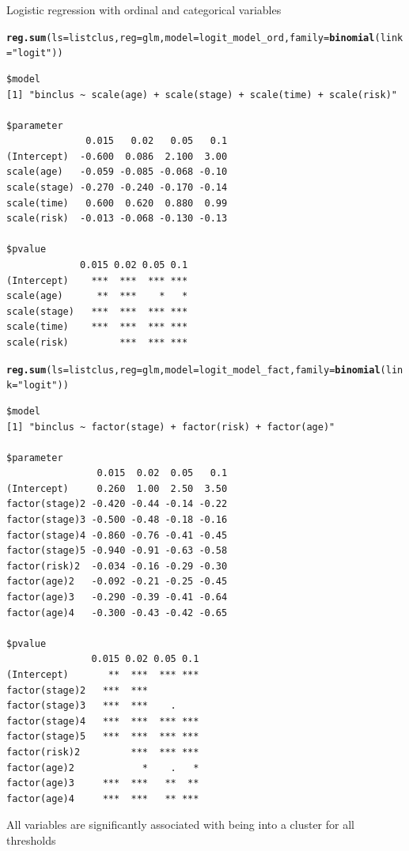\documentclass[]{revtex4}\usepackage[]{graphicx}\usepackage[]{color}
\makeatletter
\newcommand{\hlstr}[1]{\textcolor[rgb]{0.192,0.494,0.8}{#1}}%
\newcommand{\hlstd}[1]{\textcolor[rgb]{0.345,0.345,0.345}{#1}}%
\newcommand{\hlkwc}[1]{\textcolor[rgb]{0.333,0.667,0.333}{#1}}%
\newcommand{\hlkwd}[1]{\textcolor[rgb]{0.737,0.353,0.396}{\textbf{#1}}}%
\newenvironment{kframe}{%
 \def\at@end@of@kframe{}%
 \ifinner\ifhmode%
  \def\at@end@of@kframe{\end{minipage}}%
  \begin{minipage}{\columnwidth}%
 \fi\fi%
 \def\FrameCommand##1{\hskip\@totalleftmargin \hskip-\fboxsep
 \colorbox{shadecolor}{##1}\hskip-\fboxsep
     \hskip-\linewidth \hskip-\@totalleftmargin \hskip\columnwidth}%
 \MakeFramed {\advance\hsize-\width
   \@totalleftmargin\z@ \linewidth\hsize
   \@setminipage}}%
 {\par\unskip\endMakeFramed%
 \at@end@of@kframe}
\newenvironment{knitrout}{}{} %
\makeatother
\begin{document}
Logistic regression with ordinal and categorical variables
\begin{knitrout}
\color{fgcolor}\begin{kframe}
\begin{alltt}
\hlkwd{reg.sum}\hlstd{(}\hlkwc{ls} \hlstd{= listclus,} \hlkwc{reg} \hlstd{= glm,} \hlkwc{model} \hlstd{= logit_model_ord,} \hlkwc{family} \hlstd{=} \hlkwd{binomial}\hlstd{(}\hlkwc{link} \hlstd{=} \hlstr{"logit"}\hlstd{))}
\end{alltt}
\begin{verbatim}
$model
[1] "binclus ~ scale(age) + scale(stage) + scale(time) + scale(risk)"

$parameter
              0.015   0.02   0.05   0.1
(Intercept)  -0.600  0.086  2.100  3.00
scale(age)   -0.059 -0.085 -0.068 -0.10
scale(stage) -0.270 -0.240 -0.170 -0.14
scale(time)   0.600  0.620  0.880  0.99
scale(risk)  -0.013 -0.068 -0.130 -0.13

$pvalue
             0.015 0.02 0.05 0.1
(Intercept)    ***  ***  *** ***
scale(age)      **  ***    *   *
scale(stage)   ***  ***  *** ***
scale(time)    ***  ***  *** ***
scale(risk)         ***  *** ***
\end{verbatim}
\begin{alltt}
\hlkwd{reg.sum}\hlstd{(}\hlkwc{ls} \hlstd{= listclus,} \hlkwc{reg} \hlstd{= glm,} \hlkwc{model} \hlstd{= logit_model_fact,} \hlkwc{family} \hlstd{=} \hlkwd{binomial}\hlstd{(}\hlkwc{link} \hlstd{=} \hlstr{"logit"}\hlstd{))}
\end{alltt}
\begin{verbatim}
$model
[1] "binclus ~ factor(stage) + factor(risk) + factor(age)"

$parameter
                0.015  0.02  0.05   0.1
(Intercept)     0.260  1.00  2.50  3.50
factor(stage)2 -0.420 -0.44 -0.14 -0.22
factor(stage)3 -0.500 -0.48 -0.18 -0.16
factor(stage)4 -0.860 -0.76 -0.41 -0.45
factor(stage)5 -0.940 -0.91 -0.63 -0.58
factor(risk)2  -0.034 -0.16 -0.29 -0.30
factor(age)2   -0.092 -0.21 -0.25 -0.45
factor(age)3   -0.290 -0.39 -0.41 -0.64
factor(age)4   -0.300 -0.43 -0.42 -0.65

$pvalue
               0.015 0.02 0.05 0.1
(Intercept)       **  ***  *** ***
factor(stage)2   ***  ***         
factor(stage)3   ***  ***    .    
factor(stage)4   ***  ***  *** ***
factor(stage)5   ***  ***  *** ***
factor(risk)2         ***  *** ***
factor(age)2            *    .   *
factor(age)3     ***  ***   **  **
factor(age)4     ***  ***   ** ***
\end{verbatim}
\end{kframe}
\end{knitrout}
All variables are significantly associated with being into a cluster for all thresholds
\end{document}
